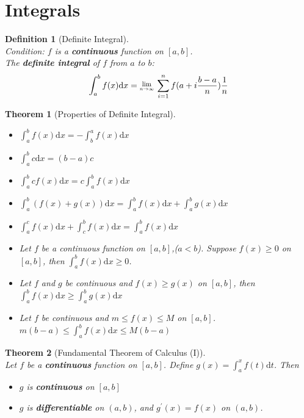 \documentclass[12pt]{article}
\newcommand{\diff}{\mathrm{d}}
\newcommand{\Lim}[1]{\raisebox{0.5ex}{\scalebox{0.8}{$\displaystyle \lim_{#1}\;$}}}
\newtheorem{definition}{Definition}[section]
\newtheorem{theorem}{Theorem}[section]
\theoremstyle{definition}
\begin{document}
\section{Integrals}
\begin{definition}[Definite Integral]
\hfill\\
\normalfont Condition: $f$ is a \textbf{continuous} function on $[a,b]$.\\
The \textbf{definite integral} of $f$ from $a$ to $b$:
\[
\int_{a}^{b} f(x)\diff x=\Lim{n\to \infty}\sum_{i=1}^{n}f(a+i\frac{b-a}{n})\frac{1}{n}
\]
\end{definition}
\begin{theorem}[Properties of Definite Integral]
\hfill\\
\normalfont
\begin{itemize}
\item $\int_{a}^{b} f(x)\diff x = -\int_{b}^{a} f(x)\diff x $ 
\item $\int_{a}^{b} c\diff x = (b-a)c$
\item $\int_{a}^{b} c f(x)\diff x = c\int_{a}^{b} f(x)\diff x$
\item $\int_{a}^{b} (f(x)+g(x))\diff x = \int_{a}^{b} f(x)\diff x+\int_{a}^{b} g(x)\diff x$
\item $\int_{a}^{c} f(x)\diff x + \int_{c}^{b} f(x)\diff x = \int_{a}^{b} f(x)\diff x$
\item Let $f$ be a continuous function on $[a,b]$,($a<b$). Suppose $f(x)\geq 0$ on $[a,b]$, then $\int_{a}^{b} f(x)\diff x\geq 0$.
\item Let $f$ and $g$ be continuous and $f(x)\geq g(x)$ on $[a,b]$, then $\int_{a}^{b} f(x)\diff x\geq \int_{a}^{b} g(x)\diff x$
\item Let $f$ be continuous and $m\leq f(x)\leq M$ on $[a,b]$. $m(b-a)\leq \int_{a}^{b} f(x)\diff x\leq M(b-a)$
\end{itemize}
\end{theorem}
\begin{theorem}[Fundamental Theorem of Calculus (I)]
\hfill\\
\normalfont Let $f$ be a \textbf{continuous} function on $[a,b]$. Define $g(x) = \int_{a}^{x} f(t)\diff t$. Then
\begin{itemize}
\item $g$ is \textbf{continuous} on $[a,b]$
\item $g$ is \textbf{differentiable} on $(a,b)$, and $g^\prime (x) = f(x)$ on $(a,b)$.
\end{itemize}
\end{theorem}
\end{document}
